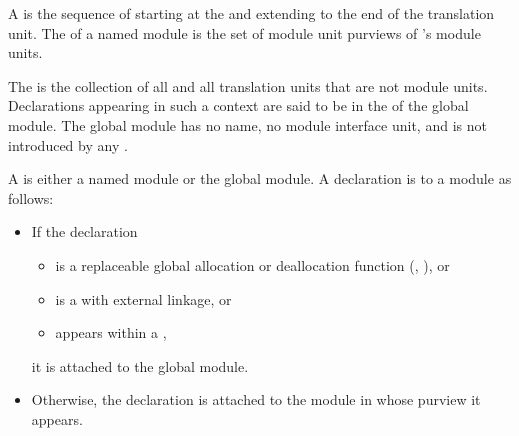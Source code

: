 \begin{std.txt}
\pnum
A  is
the sequence of 
starting at the 
and extending to the end of the translation unit.
The  of a named module  is the set of module unit purviews
of 's module units. 

\pnum
The  is the collection of all
and all translation units that are not module units.
Declarations appearing in such a context
are said to be in the  of the global module.
\enternote
The global module has no name, no module interface unit, and is not
introduced by any .
\exitnote

\pnum
  A  is either a named module or the global module.
  A declaration is  to a module as follows:
  \begin{itemize}\color{addclr}
  \item If the declaration
  \begin{itemize}\color{addclr}
  \item is a replaceable global allocation or deallocation
  function (, ), or
  \item is a  with external linkage, or
  \item appears within a ,
  \end{itemize}\color{addclr}
  it is attached to the global module.

  \item Otherwise, the declaration is
  attached to the module in whose purview it appears.
  \end{itemize}



\end{std.txt}
